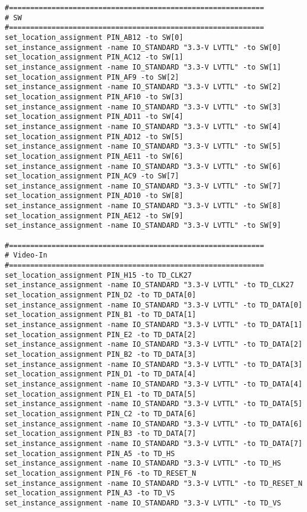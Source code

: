 \begin{verbatim}
#============================================================
# SW
#============================================================
set_location_assignment PIN_AB12 -to SW[0]
set_instance_assignment -name IO_STANDARD "3.3-V LVTTL" -to SW[0]
set_location_assignment PIN_AC12 -to SW[1]
set_instance_assignment -name IO_STANDARD "3.3-V LVTTL" -to SW[1]
set_location_assignment PIN_AF9 -to SW[2]
set_instance_assignment -name IO_STANDARD "3.3-V LVTTL" -to SW[2]
set_location_assignment PIN_AF10 -to SW[3]
set_instance_assignment -name IO_STANDARD "3.3-V LVTTL" -to SW[3]
set_location_assignment PIN_AD11 -to SW[4]
set_instance_assignment -name IO_STANDARD "3.3-V LVTTL" -to SW[4]
set_location_assignment PIN_AD12 -to SW[5]
set_instance_assignment -name IO_STANDARD "3.3-V LVTTL" -to SW[5]
set_location_assignment PIN_AE11 -to SW[6]
set_instance_assignment -name IO_STANDARD "3.3-V LVTTL" -to SW[6]
set_location_assignment PIN_AC9 -to SW[7]
set_instance_assignment -name IO_STANDARD "3.3-V LVTTL" -to SW[7]
set_location_assignment PIN_AD10 -to SW[8]
set_instance_assignment -name IO_STANDARD "3.3-V LVTTL" -to SW[8]
set_location_assignment PIN_AE12 -to SW[9]
set_instance_assignment -name IO_STANDARD "3.3-V LVTTL" -to SW[9]

#============================================================
# Video-In
#============================================================
set_location_assignment PIN_H15 -to TD_CLK27
set_instance_assignment -name IO_STANDARD "3.3-V LVTTL" -to TD_CLK27
set_location_assignment PIN_D2 -to TD_DATA[0]
set_instance_assignment -name IO_STANDARD "3.3-V LVTTL" -to TD_DATA[0]
set_location_assignment PIN_B1 -to TD_DATA[1]
set_instance_assignment -name IO_STANDARD "3.3-V LVTTL" -to TD_DATA[1]
set_location_assignment PIN_E2 -to TD_DATA[2]
set_instance_assignment -name IO_STANDARD "3.3-V LVTTL" -to TD_DATA[2]
set_location_assignment PIN_B2 -to TD_DATA[3]
set_instance_assignment -name IO_STANDARD "3.3-V LVTTL" -to TD_DATA[3]
set_location_assignment PIN_D1 -to TD_DATA[4]
set_instance_assignment -name IO_STANDARD "3.3-V LVTTL" -to TD_DATA[4]
set_location_assignment PIN_E1 -to TD_DATA[5]
set_instance_assignment -name IO_STANDARD "3.3-V LVTTL" -to TD_DATA[5]
set_location_assignment PIN_C2 -to TD_DATA[6]
set_instance_assignment -name IO_STANDARD "3.3-V LVTTL" -to TD_DATA[6]
set_location_assignment PIN_B3 -to TD_DATA[7]
set_instance_assignment -name IO_STANDARD "3.3-V LVTTL" -to TD_DATA[7]
set_location_assignment PIN_A5 -to TD_HS
set_instance_assignment -name IO_STANDARD "3.3-V LVTTL" -to TD_HS
set_location_assignment PIN_F6 -to TD_RESET_N
set_instance_assignment -name IO_STANDARD "3.3-V LVTTL" -to TD_RESET_N
set_location_assignment PIN_A3 -to TD_VS
set_instance_assignment -name IO_STANDARD "3.3-V LVTTL" -to TD_VS


\end{verbatim}

